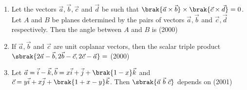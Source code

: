 \begin{enumerate}[label=\thesubsection.\arabic*.,ref=\thesubsection.\theenumi]
\begin{enumerate}
\end{enumerate}
\item Let the vectors $\vec{a},\vec{b},\vec{c}$ and $\vec{d}$ be such that $\brak{\vec{a} \times \vec{b}} \times \brak{\vec{c} \times \vec{d}} = 0$. Let $A$ and $B$ be planes determined by the pairs of vectors $\vec{a},\vec{b}$ and $\vec{c},\vec{d}$ respectively. Then the angle between $A$ and $B$ is 
\hfill (2000)
\begin{enumerate}
\end{enumerate}
\item If $\vec{a},\vec{b}$ and $\vec{c}$ are unit coplanar vectors, then the scalar triple product $\sbrak{2\vec{a}-\vec{b},2\vec{b}-\vec{c},2\vec{c}-\vec{a}} = $
\hfill (2000)
\begin{enumerate}
\end{enumerate}
\item Let $\vec{a}= \vec{i}-\vec{k},\vec{b}=x\vec{i}+\vec{j}+\brak{1-x}\vec{k}$ and $\vec{c}= y\vec{i}+x\vec{j}+\brak{1+x-y}\vec{k}$. Then $\sbrak{\vec{a} \ \vec{b} \ \vec{c}}$ depends on 
\hfill (2001)
\begin{enumerate}

\end{enumerate}
\end{enumerate}
